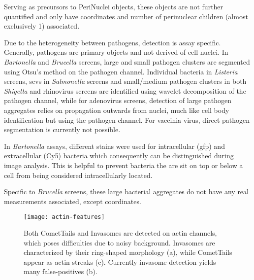 \begin{description}[leftmargin=0.5cm]
\item[ExpandedNuclei:] Serving as precursors to PeriNuclei objects, these objects are not further quantified and only have coordinates and number of perinuclear children (almost exclusively 1) associated.
\item[Bacteria/Viruses/Pathogen:] Due to the heterogeneity between pathogens, detection is assay specific. Generally, pathogens are primary objects and not derived of cell nuclei. In \textit{Bartonella} and \textit{Brucella} screens, large and small pathogen clusters are segmented using Otsu's method on the pathogen channel. Individual bacteria in \textit{Listeria} screens, \glspl{scv} in \textit{Salmonella} screens and small\slash medium pathogen clusters in both \textit{Shigella} and rhinovirus screens are identified using wavelet decomposition of the pathogen channel, while for adenovirus screens, detection of large pathogen aggregates relies on propagation outwards from nuclei, much like cell body identification but using the pathogen channel. For vaccinia virus, direct pathogen segmentation is currently not possible.
\item[IntBacteria/ExtBacteria:] In \textit{Bartonella} assays, different stains were used for intracellular (\acrshort{gfp}) and extracellular (Cy5) bacteria which consequently can be distinguished during image analysis. This is helpful to prevent bacteria the are sit on top or below a cell from being considered intracellularly located.
\item[BlobBacteria:] Specific to \textit{Brucella} screens, these large bacterial aggregates do not have any real measurements associated, except coordinates.

\begin{figure}
  \centering
  \texttt{[image: actin-features]}
  \caption[Detection of two actin based structures, CometTails and Invasomes.]{Both CometTails and Invasomes are detected on actin channels, which poses difficulties due to noisy background. Invasomes are characterized by their ring-shaped morphology (a), while CometTails appear as actin streaks (c). Currently invasome detection yields many false-positives (b).}
  \label{fig:actin-features}
\end{figure}


\end{description}
